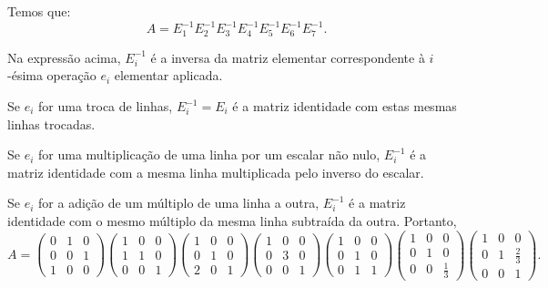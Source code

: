 \begin{example}
    Temos que:
    \begin{equation*}
        A = E_1^{-1} E_2^{-1} E_3^{-1} E_4^{-1} E_5^{-1} E_6^{-1} E_7^{-1}.
    \end{equation*}

    Na expressão acima, $E_i^{-1}$ é a inversa da matriz elementar correspondente à $i$-ésima operação $e_i$ elementar aplicada.

    Se $e_i$ for uma troca de linhas, $E_i^{-1}=E_i$ é a matriz identidade com estas mesmas linhas trocadas.

    Se $e_i$ for uma multiplicação de uma linha por um escalar não nulo, $E_i^{-1}$ é a matriz identidade com a mesma linha multiplicada pelo inverso do escalar.

    Se $e_i$ for a adição de um múltiplo de uma linha a outra, $E_i^{-1}$ é a matriz identidade com o mesmo múltiplo da mesma linha subtraída da outra.
    Portanto,
    \begin{equation*}
        A = \begin{pmatrix}
            0 & 1 & 0 \\
            0 & 0 & 1 \\
            1 & 0 & 0
        \end{pmatrix}
        \begin{pmatrix}
            1 & 0 & 0 \\
            1 & 1 & 0 \\
            0 & 0 & 1
        \end{pmatrix}
        \begin{pmatrix}
            1 & 0 & 0 \\
            0 & 1 & 0 \\
            2 & 0 & 1
        \end{pmatrix}
        \begin{pmatrix}
            1 & 0 & 0 \\
            0 & 3 & 0 \\
            0 & 0 & 1
        \end{pmatrix}
        \begin{pmatrix}
            1 & 0 & 0 \\
            0 & 1 & 0 \\
            0 & 1 & 1
        \end{pmatrix}
        \begin{pmatrix}
            1 & 0 & 0 \\
            0 & 1 & 0 \\
            0 & 0 & \frac{1}{3}
        \end{pmatrix}
        \begin{pmatrix}
            1 & 0 & 0 \\
            0 & 1 & \frac{2}{3} \\
            0 & 0 & 1
        \end{pmatrix}.
    \end{equation*}
\end{example}

